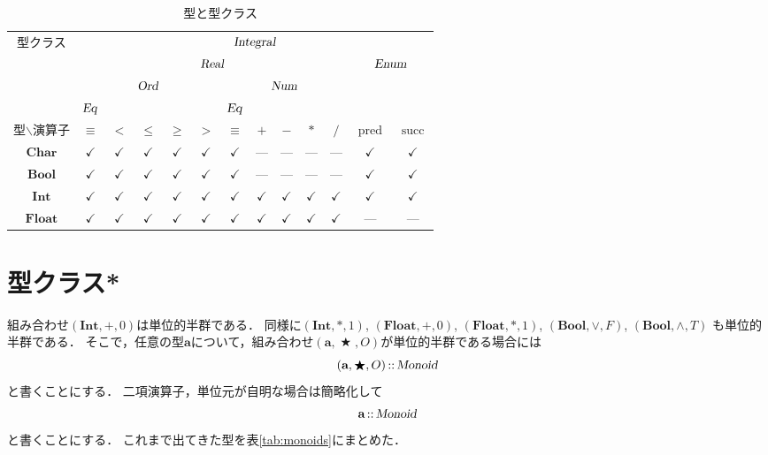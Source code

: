 \documentclass[twocolumn]{jsbook}
\newcommand{\hsklType}[1]{\textbf{#1}}
\newcommand{\hsklTypeclass}[1]{\textsl{#1}}
\DeclareMathOperator{\hsklPred}{pred}
\DeclareMathOperator{\hsklSucc}{succ}
\newcommand{\hsklBool}{\hsklType{Bool}}
\newcommand{\hsklChar}{\hsklType{Char}}
\newcommand{\hsklEnum}{\hsklTypeclass{Enum}}
\newcommand{\hsklInt}{\hsklType{Int}}
\newcommand{\hsklIntegral}{\hsklTypeclass{Integral}}
\newcommand{\hsklEq}{\hsklTypeclass{Eq}}
\newcommand{\hsklFloat}{\hsklType{Float}}
\newcommand{\hsklMonoid}{\hsklTypeclass{Monoid}}
\newcommand{\hsklNum}{\hsklTypeclass{Num}}
\newcommand{\hsklOrd}{\hsklTypeclass{Ord}}
\newcommand{\hsklReal}{\hsklTypeclass{Real}}
\DeclareMathOperator{\mathAnyBinaryOperator}{\bigstar}
\DeclareMathOperator{\mathIn}{::}
\newcommand{\mathMonoid}[3]{(#1,#2,#3)}
\begin{document}
\begin{table*}
\caption{型と型クラス}
\label{tab:type-and-typeclass}
\begin{center}
\begin{tabular}{||c||c|c|c|c|c|c|c|c|c|c|c|c||}
\hline
\multirow{4}{*}{型クラス}
    &\multicolumn{12}{|c||}{$\hsklIntegral$}\\
\cline{2-13}
\multirow{3}{*}{}
    &\multicolumn{10}{|c|}{$\hsklReal$}
    &\multicolumn{2}{|c||}{$\hsklEnum$}\\
\cline{2-11}
\multirow{2}{*}{}
    &\multicolumn{5}{|c|}{$\hsklOrd$}
    &\multicolumn{5}{|c|}{$\hsklNum$}
    &\multicolumn{2}{|c||}{ }\\
\cline{2-2}\cline{7-7}
{ }
    &$\hsklEq$
    &\multicolumn{4}{|c|}{ }
    &$\hsklEq$
    &\multicolumn{4}{|c|}{ }
    &\multicolumn{2}{|c||}{ }\\
\hline\hline
型$\backslash$演算子
    &$\equiv$
    &$<$
    &$\le$
    &$\ge$
    &$>$
    &$\equiv$
    &$+$
    &$-$
    &$*$
    &$/$
    &$\hsklPred$
    &$\hsklSucc$\\
\hline
$\hsklChar$
    &$\checkmark$
    &$\checkmark$
    &$\checkmark$
    &$\checkmark$
    &$\checkmark$
    &$\checkmark$
    &---
    &---
    &---
    &---
    &$\checkmark$
    &$\checkmark$\\
\hline
$\hsklBool$
    &$\checkmark$
    &$\checkmark$
    &$\checkmark$
    &$\checkmark$
    &$\checkmark$
    &$\checkmark$
    &---
    &---
    &---
    &---
    &$\checkmark$
    &$\checkmark$\\
\hline
$\hsklInt$
    &$\checkmark$
    &$\checkmark$
    &$\checkmark$
    &$\checkmark$
    &$\checkmark$
    &$\checkmark$
    &$\checkmark$
    &$\checkmark$
    &$\checkmark$
    &$\checkmark$
    &$\checkmark$
    &$\checkmark$\\
\hline
$\hsklFloat$
    &$\checkmark$
    &$\checkmark$
    &$\checkmark$
    &$\checkmark$
    &$\checkmark$
    &$\checkmark$
    &$\checkmark$
    &$\checkmark$
    &$\checkmark$
    &$\checkmark$
    &---
    &---\\
\hline
\end{tabular}
\end{center}
\end{table*}

\section{型クラス*}

組み合わせ$\mathMonoid{\hsklInt}{+}{0}$は単位的半群である．
同様に$\mathMonoid{\hsklInt}{*}{1}$, $\mathMonoid{\hsklFloat}{+}{0}$, $\mathMonoid{\hsklFloat}{*}{1}$, $\mathMonoid{\hsklBool}{\vee}{F}$, $\mathMonoid{\hsklBool}{\wedge}{T}$ も単位的半群である．
そこで，任意の型$\hsklType{a}$について，組み合わせ$\mathMonoid{\hsklType{a}}{\mathAnyBinaryOperator}{O}$が単位的半群である場合には$$\mathMonoid{\hsklType{a}}{\mathAnyBinaryOperator}{O}\mathIn\hsklMonoid$$と書くことにする．
二項演算子，単位元が自明な場合は簡略化して$$\hsklType{a}\mathIn\hsklMonoid$$と書くことにする．
これまで出てきた型を表\ref{tab:monoids}にまとめた．
\end{document}
